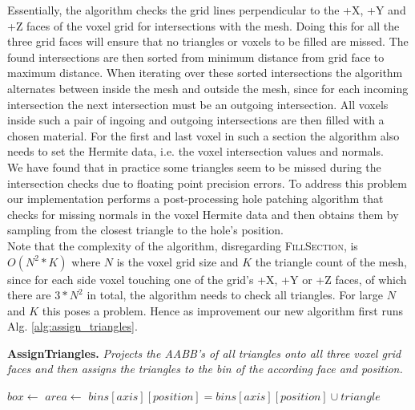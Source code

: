 Essentially, the algorithm checks the grid lines perpendicular to the +X, +Y and +Z faces of the voxel grid for intersections
with the mesh. Doing this for all the three grid faces will ensure that no triangles or voxels to be filled are missed.
The found intersections are then sorted from minimum distance from grid face to maximum distance. When iterating over these
sorted intersections the algorithm alternates between inside the mesh and outside the mesh, since for each incoming intersection
the next intersection must be an outgoing intersection. All voxels inside such a pair of ingoing and outgoing intersections are
then filled with a chosen material. For the first and last voxel in such a section the algorithm also needs to set the Hermite data, i.e. the voxel intersection values and normals.\\
We have found that in practice some triangles seem to be missed during the intersection checks due to floating point precision errors. To address this problem our implementation performs a post-processing
hole patching algorithm that checks for missing normals in the voxel Hermite data and then obtains them by sampling from the closest
triangle to the hole's position.\\
Note that the complexity of the algorithm, disregarding \textsc{FillSection}, is $O(N^2 * K)$ where $N$ is the voxel grid
size and $K$ the triangle count of the mesh, since for each side voxel touching one of the grid's +X, +Y or +Z faces, of which there are $3*N^2$ in total, the algorithm needs to check all triangles. For large $N$ and $K$ this poses a problem. Hence as improvement our new
algorithm first runs Alg. \ref{alg:assign_triangles}.

\begin{algorithm}[H]
\caption{\textbf{AssignTriangles.} \textit{Projects the AABB's of all triangles onto all three voxel grid faces and then
assigns the triangles to the bin of the according face and position.}}\label{alg:assign_triangles}
\begin{algorithmic}[1]
			\State $box \gets$ 
			\State $area \gets$ 
				\State $bins[axis][position] = bins[axis][position] \cup triangle$
			\EndFor
		\EndFor
	\EndFor
\EndProcedure
\end{algorithmic}
\end{algorithm}

